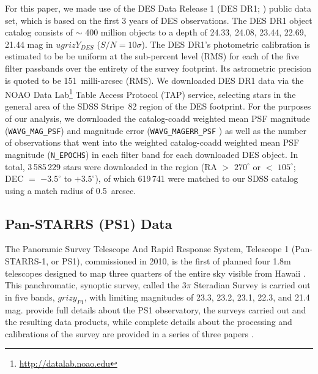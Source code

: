 \documentclass{aastex63}
\begin{document}
For this paper, we made use of the DES Data Release 1 (DES DR1;
\citealt{2018ApJS..239...18A}) public data set, which is based on the
first 3 years of DES observations.  The DES DR1 object catalog
consists of $\sim$ 400 million objects to a depth of 24.33, 24.08,
23.44, 22.69, 21.44 mag in $ugrizY_{DES}$ ($S/N=10\sigma$).  The DES
DR1's photometric calibration is estimated to be be uniform at the
sub-percent level (RMS) for each of the five filter passbands over the
entirety of the survey footprint.  Its astrometric precision is quoted
to be 151~milli-arcsec (RMS).  We downloaded DES DR1 data via the NOAO
Data Lab\footnote{\url{http://datalab.noao.edu}} Table Access Protocol
(TAP) service, selecting stars in the general area of the SDSS
Stripe~82 region of the DES footprint.  For the purposes of our
analysis, we downloaded the catalog-coadd weighted mean PSF magnitude
({\tt WAVG\_MAG\_PSF}) and magnitude error ({\tt WAVG\_MAGERR\_PSF} )
as well as the number of observations that went into the weighted
catalog-coadd weighted mean PSF magnitude ({\tt N\_EPOCHS}) in each
filter band for each downloaded DES object.  In total, 3\,585\,229
stars were downloaded in the region (RA $>$ $270^{\circ}$ or $<$
$105^{\circ}$; DEC $=$ $-3.5^{\circ}$ to $+3.5^{\circ}$), of which
619\,741 were matched to our SDSS catalog using a match radius of
0.5~arcsec.




\subsection{Pan-STARRS (PS1) Data} \label{ssec:ps1}
 
The Panoramic Survey Telescope And Rapid Response System, Telescope 1 (Pan-STARRS-1, or PS1), commissioned 
in 2010, is the first of planned four 1.8m telescopes designed to map three quarters of the entire sky visible from 
Hawaii \citep{2010SPIE.7733E..0EK}. This panchromatic, synoptic survey, called the 3$\pi$ Steradian Survey is 
carried out in five bands, $grizy_{P1}$, with limiting magnitudes of 23.3, 23.2, 23.1, 22.3, and 21.4 mag. 
\citet{2016arXiv161205560C}  provide full details about the PS1 observatory, the surveys carried out and the 
resulting data products, while complete details about the processing and calibrations of the survey are 
provided in a series of three papers \cite{Euge20a, Euge20b, Euge20c}. 
 
\end{document}
